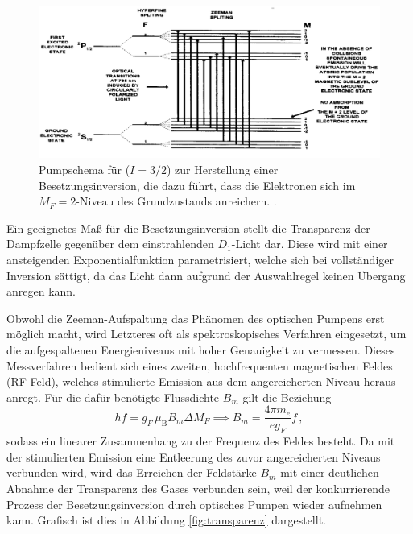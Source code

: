   \begin{figure}
    \centering
    \includegraphics[width=\textwidth]{pictures/pumpschema.png}
    \caption{Pumpschema für  ($I=3/2$) zur Herstellung einer Besetzungsinversion, die dazu führt, dass die Elektronen sich im $M_F=2$-Niveau des Grundzustands anreichern. \cite{caltech}.}
    \label{fig:pumpschema}
  \end{figure}

  Ein geeignetes Maß für die Besetzungsinversion stellt die Transparenz der Dampfzelle gegenüber dem einstrahlenden $D_1$-Licht dar. Diese wird mit einer ansteigenden Exponentialfunktion parametrisiert, welche sich bei vollständiger Inversion sättigt, da das Licht dann aufgrund der Auswahlregel keinen Übergang anregen kann.

  Obwohl die Zeeman-Aufspaltung das Phänomen des optischen Pumpens erst möglich macht, wird Letzteres oft als spektroskopisches Verfahren eingesetzt, um die aufgespaltenen Energieniveaus mit hoher Genauigkeit zu vermessen. Dieses Messverfahren bedient sich eines zweiten, hochfrequenten magnetischen Feldes (RF-Feld), welches stimulierte Emission aus dem angereicherten Niveau heraus anregt. Für die dafür benötigte Flussdichte $B_m$ gilt die Beziehung
  \begin{equation}
    h f = g_F \, \mu_{\text{B}} B_m \Delta M_F \implies B_m = \frac{4 \pi m_e}{e g_F} f\,,
    \label{eqn:B_M_Theorie}
  \end{equation}
  sodass ein linearer Zusammenhang zu der Frequenz des Feldes besteht.
  Da mit der stimulierten Emission eine Entleerung des zuvor angereicherten Niveaus verbunden wird, wird das Erreichen der Feldstärke $B_m$ mit einer deutlichen Abnahme der Transparenz des Gases verbunden sein, weil der konkurrierende Prozess der Besetzungsinversion durch optisches Pumpen wieder aufnehmen kann. Grafisch ist dies in Abbildung \ref{fig:transparenz} dargestellt.

